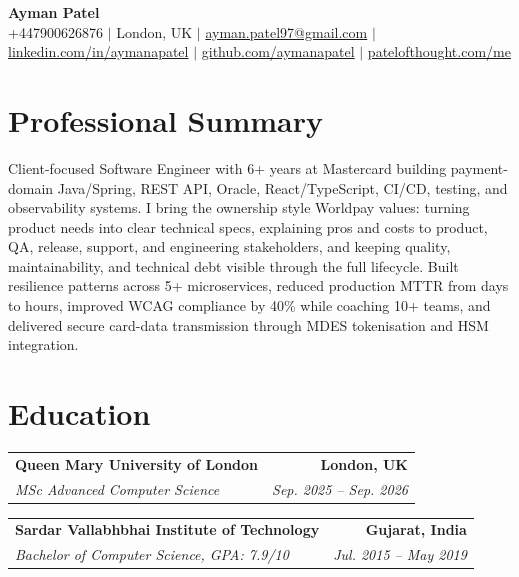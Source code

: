 \documentclass[a4paper,10pt]{article}
\makeatletter
\newcommand{\resumeSubheading}[4]{%
  \vspace{1pt}
  \begin{tabular*}{\textwidth}[t]{l@{\extracolsep{\fill}}r}
    \textbf{#1} & \textbf{\small #2} \\
    \textit{\small #3} & \textit{\small #4} \\
  \end{tabular*}\vspace{-2pt}
}
\makeatother
\begin{document}
\small

\begin{center}
  {\Huge\bfseries Ayman Patel}\\[2pt]
  +447900626876 $|$ London, UK $|$
  \href{mailto:ayman.patel97@gmail.com}{ayman.patel97@gmail.com} $|$
  \href{https://linkedin.com/in/aymanapatel}{linkedin.com/in/aymanapatel} $|$
  \href{https://github.com/aymanapatel}{github.com/aymanapatel} $|$
  \href{https://patelofthought.com/me}{patelofthought.com/me}
\end{center}
\vspace{-7pt}

\section{Professional Summary}
Client-focused Software Engineer with 6+ years at Mastercard building payment-domain Java/Spring, REST API, Oracle, React/TypeScript, CI/CD, testing, and observability systems. I bring the ownership style Worldpay values: turning product needs into clear technical specs, explaining pros and costs to product, QA, release, support, and engineering stakeholders, and keeping quality, maintainability, and technical debt visible through the full lifecycle. Built resilience patterns across 5+ microservices, reduced production MTTR from days to hours, improved WCAG compliance by 40\% while coaching 10+ teams, and delivered secure card-data transmission through MDES tokenisation and HSM integration.

\section{Education}
\resumeSubheading
  {Queen Mary University of London}{London, UK}
  {MSc Advanced Computer Science}{Sep. 2025 -- Sep. 2026}
\resumeSubheading
  {Sardar Vallabhbhai Institute of Technology}{Gujarat, India}
  {Bachelor of Computer Science, GPA: 7.9/10}{Jul. 2015 -- May 2019}
\end{document}
